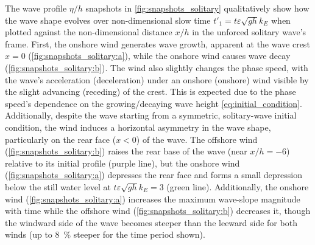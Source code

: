 \documentclass{jfm}
\renewcommand*{\epsilon}{\varepsilon}
\begin{document}
The wave profile $\eta/h$ snapshots in \cref{fig:snapshots_solitary}
qualitatively show how the wave shape evolves over non-dimensional slow
time $t'_1 = t \epsilon \sqrt{g h} k_E$ when plotted against the
non-dimensional distance $x/h$ in the unforced solitary wave's frame.
First, the onshore wind generates wave growth, apparent at the wave
crest $x=0$ (\cref{fig:snapshots_solitary:a}), while the onshore wind
causes wave decay (\cref{fig:snapshots_solitary:b}).
The wind also slightly changes the phase speed, with the wave's
acceleration (deceleration) under an onshore (onshore) wind visible by
the slight advancing (receding) of the crest.
This is expected due to the phase speed's dependence on the
growing/decaying wave height \cref{eq:initial_condition}.
Additionally, despite the wave starting from a symmetric, solitary-wave
initial condition, the wind induces a horizontal asymmetry in the wave
shape, particularly on the rear face ($x<0$) of the wave.
The offshore wind (\cref{fig:snapshots_solitary:b}) raises the
rear base of the wave (near $x/h = -6$) relative to its initial profile
(purple line), but the onshore wind (\cref{fig:snapshots_solitary:a})
depresses the rear face and forms a small depression below the still
water level at $t\epsilon \sqrt{gh} k_E=3$ (green line).
Additionally, the onshore wind (\cref{fig:snapshots_solitary:a})
increases the maximum wave-slope magnitude with time while the offshore
wind (\cref{fig:snapshots_solitary:b}) decreases it, though the windward
side of the wave becomes steeper than the leeward side for both winds
(up to \SI{8}{\percent} steeper for the time period shown).
\end{document}
